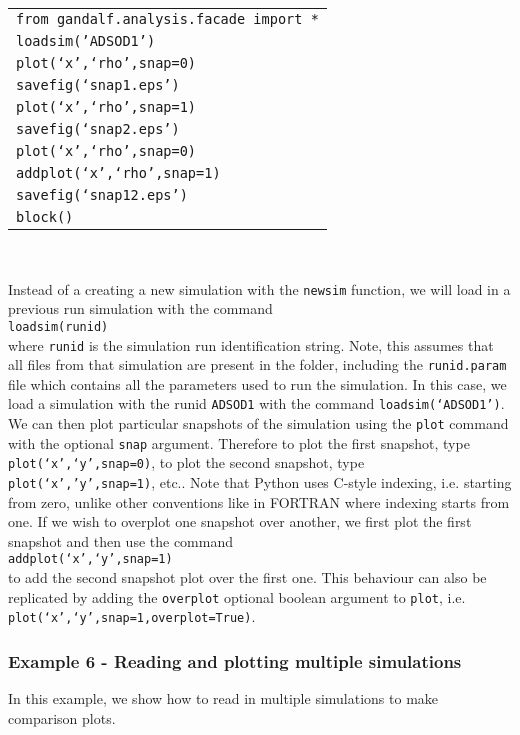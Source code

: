 \documentclass[a4paper]{article}
\newcommand{\var}[1]{\texttt{#1}}
\newcommand{\singlecommand}[1]{\\ \newline \indent \var{#1} \\ \newline \noindent}
\begin{document}
\begin{tabular}{p{14.0cm}}
\var{from gandalf.analysis.facade import *} \\
\var{loadsim('ADSOD1')} \\
\var{plot(`x',`rho',snap=0)} \\
\var{savefig(`snap1.eps')} \\
\var{plot(`x',`rho',snap=1)} \\
\var{savefig(`snap2.eps')} \\
\var{plot(`x',`rho',snap=0)} \\
\var{addplot(`x',`rho',snap=1)} \\
\var{savefig(`snap12.eps')} \\
\var{block()} \\
\end{tabular} \\
\newline

\noindent Instead of a creating a new simulation with the \var{newsim} function, we will load in a previous run simulation with the command \singlecommand{loadsim(runid)} where \var{runid} is the simulation run identification string.  Note, this assumes that all files from that simulation are present in the folder, including the \var{runid.param} file which contains all the parameters used to run the simulation.  In this case, we load a simulation with the runid \var{ADSOD1} with the command \var{loadsim(`ADSOD1')}.  We can then plot particular snapshots of the simulation using the \var{plot} command with the optional \var{snap} argument.  Therefore to plot the first snapshot, type \var{plot(`x',`y',snap=0)}, to plot the second snapshot, type \var{plot(`x','y',snap=1)}, etc..  Note that Python uses C-style indexing, i.e. starting from zero, unlike other conventions like in FORTRAN where indexing starts from one.  If we wish to overplot one snapshot over another, we first plot the first snapshot and then use the command \singlecommand{addplot(`x',`y',snap=1)} to add the second snapshot plot over the first one.  This behaviour can also be replicated by adding the \var{overplot} optional boolean argument to \var{plot}, i.e. \var{plot(`x',`y',snap=1,overplot=True)}.


\subsubsection{Example 6 - Reading  and plotting multiple simulations}
In this example, we show how to read in multiple simulations to make comparison plots. \\
\end{document}

